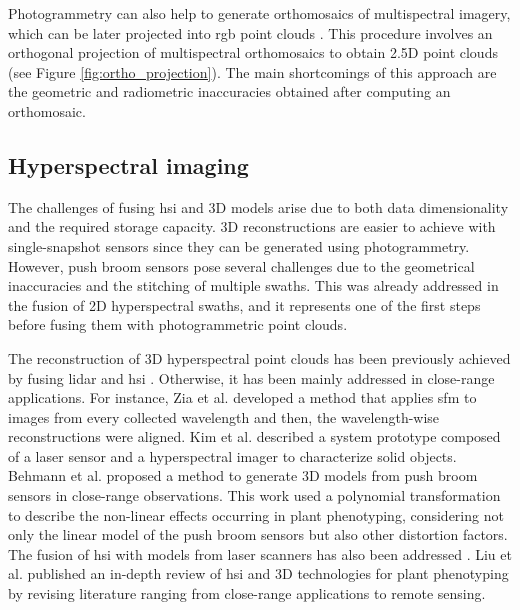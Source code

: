 Photogrammetry can also help to generate orthomosaics of multispectral imagery, which can be later projected into \acrshort{rgb} point clouds \cite{comba_unsupervised_2018}. This procedure involves an orthogonal projection of multispectral orthomosaics to obtain 2.5D point clouds (see Figure \ref{fig:ortho_projection}). The main shortcomings of this approach are the geometric and radiometric inaccuracies obtained after computing an orthomosaic.

\subsection{Hyperspectral imaging}

The challenges of fusing \acrshort{hsi} and 3D models arise due to both data dimensionality and the required storage capacity. 3D reconstructions are easier to achieve with single-snapshot sensors since they can be generated using photogrammetry. However, push broom sensors pose several challenges due to the geometrical inaccuracies and the stitching of multiple swaths. This was already addressed in the fusion of 2D hyperspectral swaths, and it represents one of the first steps before fusing them with photogrammetric point clouds. 

The reconstruction of 3D hyperspectral point clouds has been previously achieved by fusing \acrshort{lidar} and \acrshort{hsi} \cite{lin_detection_2019, sankey_uav_2018}. Otherwise, it has been mainly addressed in close-range applications. For instance, Zia et al. \cite{zia_3d_2015} developed a method that applies \acrshort{sfm} to images from every collected wavelength and then, the wavelength-wise reconstructions were aligned. Kim et al. \cite{kim_3d_2012} described a system prototype composed of a laser sensor and a hyperspectral imager to characterize solid objects. Behmann et al. \cite{behmann_calibration_2015} proposed a method to generate 3D models from push broom sensors in close-range observations. This work used a polynomial transformation to describe the non-linear effects occurring in plant phenotyping, considering not only the linear model of the push broom sensors but also other distortion factors. The fusion of \acrshort{hsi} with models from laser scanners has also been addressed \cite{behmann_generation_2016}. Liu et al. \cite{liu_hyperspectral_2020} published an in-depth review of \acrshort{hsi} and 3D technologies for plant phenotyping by revising literature ranging from close-range applications to remote sensing. 

